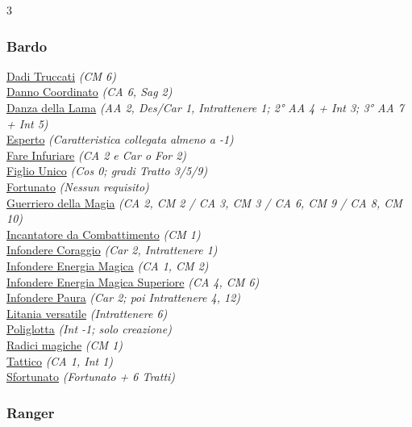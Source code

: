 \begin{multicols}{3}
{\begin{flushleft}
\subsubsection*{Bardo}

\hyperlink{Dadi Truccati}{Dadi Truccati} \textit{(CM 6)}\\
\hyperlink{Danno Coordinato}{Danno Coordinato} \textit{(CA 6, Sag 2)}\\
\hyperlink{Danza della Lama}{Danza della Lama} \textit{(AA 2, Des/Car 1, Intrattenere 1; 2° AA 4 + Int 3; 3° AA 7 + Int 5)}\\
\hyperlink{Esperto}{Esperto} \textit{(Caratteristica collegata almeno a -1)}\\
\hyperlink{Fare Infuriare}{Fare Infuriare} \textit{(CA 2 e Car o For 2)}\\
\hyperlink{Figlio Unico}{Figlio Unico} \textit{(Cos 0; gradi Tratto 3/5/9)}\\
\hyperlink{Fortunato}{Fortunato} \textit{(Nessun requisito)}\\
\hyperlink{Guerriero della Magia}{Guerriero della Magia} \textit{(CA 2, CM 2 / CA 3, CM 3 / CA 6, CM 9 / CA 8, CM 10)}\\
\hyperlink{Incantatore da Combattimento}{Incantatore da Combattimento} \textit{(CM 1)}\\
\hyperlink{Infondere Coraggio}{Infondere Coraggio} \textit{(Car 2, Intrattenere 1)}\\
\hyperlink{Infondere Energia Magica}{Infondere Energia Magica} \textit{(CA 1, CM 2)}\\
\hyperlink{Infondere Energia Magica Superiore}{Infondere Energia Magica Superiore} \textit{(CA 4, CM 6)}\\
\hyperlink{Infondere Paura}{Infondere Paura} \textit{(Car 2; poi Intrattenere 4, 12)}\\
\hyperlink{Litania versatile}{Litania versatile} \textit{(Intrattenere 6)}\\
\hyperlink{Poliglotta}{Poliglotta} \textit{(Int -1; solo creazione)}\\
\hyperlink{Radici magiche}{Radici magiche} \textit{(CM 1)}\\
\hyperlink{Tattico}{Tattico} \textit{(CA 1, Int 1)}\\
\hyperlink{Sfortunato}{Sfortunato} \textit{(Fortunato + 6 Tratti)}\\

\subsubsection*{Ranger}


\end{flushleft}}
\end{multicols}
